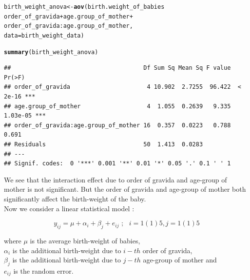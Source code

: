 \documentclass[11pt, a4paper]{article}\usepackage[]{graphicx}\usepackage[]{xcolor}
\makeatletter
\newcommand{\hlopt}[1]{\textcolor[rgb]{0,0,0}{#1}}%
\newcommand{\hlstd}[1]{\textcolor[rgb]{0.345,0.345,0.345}{#1}}%
\newcommand{\hlkwb}[1]{\textcolor[rgb]{0.69,0.353,0.396}{#1}}%
\newcommand{\hlkwc}[1]{\textcolor[rgb]{0.333,0.667,0.333}{#1}}%
\newcommand{\hlkwd}[1]{\textcolor[rgb]{0.737,0.353,0.396}{\textbf{#1}}}%
\newenvironment{kframe}{%
 \def\at@end@of@kframe{}%
 \ifinner\ifhmode%
  \def\at@end@of@kframe{\end{minipage}}%
  \begin{minipage}{\columnwidth}%
 \fi\fi%
 \def\FrameCommand##1{\hskip\@totalleftmargin \hskip-\fboxsep
 \colorbox{shadecolor}{##1}\hskip-\fboxsep
     \hskip-\linewidth \hskip-\@totalleftmargin \hskip\columnwidth}%
 \MakeFramed {\advance\hsize-\width
   \@totalleftmargin\z@ \linewidth\hsize
   \@setminipage}}%
 {\par\unskip\endMakeFramed%
 \at@end@of@kframe}
\newenvironment{knitrout}{}{} %
\makeatother
\begin{document}
\begin{knitrout}
\color{fgcolor}\begin{kframe}
\begin{alltt}
\hlstd{birth_weight_anova} \hlkwb{<-} \hlkwd{aov}\hlstd{(birth.weight_of_babies} \hlopt{~}
    \hlstd{order_of_gravida} \hlopt{+} \hlstd{age.group_of_mother} \hlopt{+}
        \hlstd{order_of_gravida}\hlopt{:}\hlstd{age.group_of_mother,}
    \hlkwc{data} \hlstd{= birth_weight_data)}
\end{alltt}
\end{kframe}
\end{knitrout}

\begin{knitrout}
\color{fgcolor}\begin{kframe}
\begin{alltt}
\hlkwd{summary}\hlstd{(birth_weight_anova)}
\end{alltt}
\begin{verbatim}
##                                      Df Sum Sq Mean Sq F value   Pr(>F)    
## order_of_gravida                      4 10.902  2.7255  96.422  < 2e-16 ***
## age.group_of_mother                   4  1.055  0.2639   9.335 1.03e-05 ***
## order_of_gravida:age.group_of_mother 16  0.357  0.0223   0.788    0.691    
## Residuals                            50  1.413  0.0283                     
## ---
## Signif. codes:  0 '***' 0.001 '**' 0.01 '*' 0.05 '.' 0.1 ' ' 1
\end{verbatim}
\end{kframe}
\end{knitrout}

We see that the interaction effect due to order of gravida and age-group of mother is not significant. But the order of gravida and age-group of mother both significantly affect the birth-weight of the baby. \\


Now we consider a linear statistical model :

$$y_{ij} = \mu + \alpha_i + \beta_j + e_{ij} \,\, ; \,\,\,\, i = 1(1)5, j = 1(1)5$$

where $\mu$ is the average birth-weight of babies, \\
$\alpha_i$ is the additional birth-weight due to $i-th$ order of gravida, \\
$\beta_j$ is the additional birth-weight due to $j-th$ age-group of mother and \\
$e_{ij}$ is the random error. \\
\end{document}
